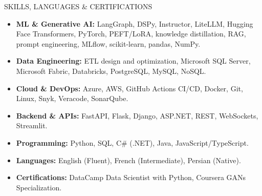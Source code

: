 \documentclass{resume}
\begin{document}
\begin{rSection}{SKILLS, LANGUAGES \& CERTIFICATIONS}

\begin{itemize}
    \itemsep -3pt {}
    \item \textbf{ML \& Generative AI:} LangGraph, DSPy, Instructor, LiteLLM, Hugging Face Transformers, PyTorch, PEFT/LoRA, knowledge distillation, RAG, prompt engineering, MLflow, scikit-learn, pandas, NumPy.
    \item \textbf{Data Engineering:} ETL design and optimization, Microsoft SQL Server, Microsoft Fabric, Databricks, PostgreSQL, MySQL, NoSQL.
    \item \textbf{Cloud \& DevOps:} Azure, AWS, GitHub Actions CI/CD, Docker, Git, Linux, Snyk, Veracode, SonarQube.
    \item \textbf{Backend \& APIs:} FastAPI, Flask, Django, ASP.NET, REST, WebSockets, Streamlit.
    \item \textbf{Programming:} Python, SQL, C\# (.NET), Java, JavaScript/TypeScript.
    \item \textbf{Languages:} English (Fluent), French (Intermediate), Persian (Native).
    \item \textbf{Certifications:} DataCamp Data Scientist with Python, Coursera GANs Specialization.
\end{itemize}

\end{rSection}
\end{document}
